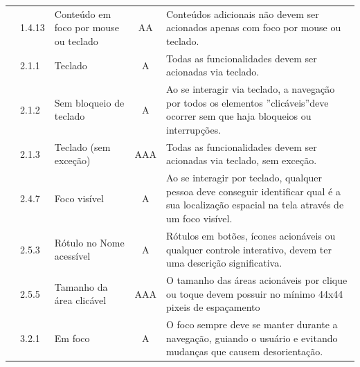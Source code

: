 {{\begin{minipage}{\linewidth}
{\begin{tabular}{|c|l|l|c|p{400px}|}
        \cline{2-5} & 1.4.13 & Conteúdo em foco por mouse ou teclado & AA & Conteúdos adicionais não devem ser acionados apenas com foco por mouse ou teclado.\\
        \cline{2-5} & 2.1.1 & Teclado & A & Todas as funcionalidades devem ser acionadas via teclado. \\
        \cline{2-5} & 2.1.2 & Sem bloqueio de teclado & A & Ao se interagir via teclado, a navegação por todos os elementos ”clicáveis”deve ocorrer sem que haja bloqueios ou interrupções.\\
        \cline{2-5} & 2.1.3 & Teclado (sem exceção) & AAA & Todas as funcionalidades devem ser acionadas via teclado, sem exceção.\\
        \cline{2-5} & 2.4.7 & 
        Foco visível  & A & Ao se interagir por teclado, qualquer pessoa deve conseguir identificar qual é a sua localização espacial na tela através de um foco visível.\\
        \cline{2-5} & 2.5.3 & Rótulo no Nome acessível & A & Rótulos em botões, ícones acionáveis ou qualquer controle interativo, devem ter uma descrição significativa.\\
         \cline{2-5} & 2.5.5 & Tamanho da área clicável & AAA & O tamanho das áreas acionáveis por clique ou toque devem possuir no mínimo 44x44 pixeis de espaçamento\\
        \cline{2-5} & 3.2.1 & Em foco & A & O foco sempre deve se manter durante a navegação, guiando o usuário e evitando mudanças que causem desorientação.\\


\end{tabular}}
\end{minipage}}}
